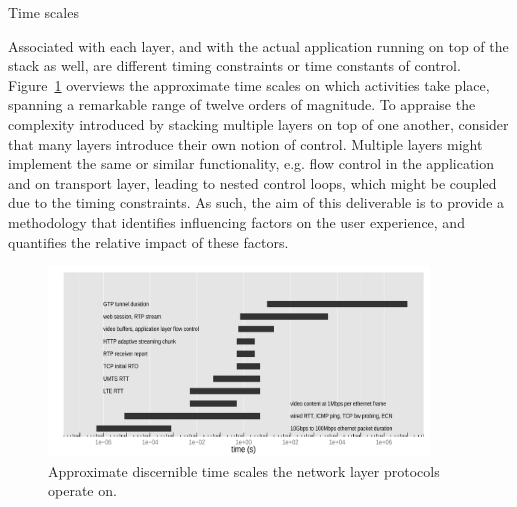 Time scales



Associated with each layer, and with the actual application running on top of the stack as well, are different timing constraints or time constants of control. Figure~\ref{c5:fig:timescales} overviews the approximate time scales on which activities take place, spanning a remarkable range of twelve orders of magnitude.
To appraise the complexity introduced by stacking multiple layers on top of one another, consider that many layers introduce their own notion of control. Multiple layers might implement the same or similar functionality, e.g. flow control in the application and on transport layer, leading to nested control loops, which might be coupled due to the timing constraints. As such, the aim of this deliverable is to provide a methodology that identifies influencing factors on the user experience, and quantifies the relative impact of these factors.

\begin{figure}[htb]
	\centering
	\includegraphics[width=0.9\textwidth]{images/layer-timescales.pdf}
	\caption{Approximate discernible time scales the network layer protocols operate on.}
\label{c5:fig:timescales}
\end{figure}

